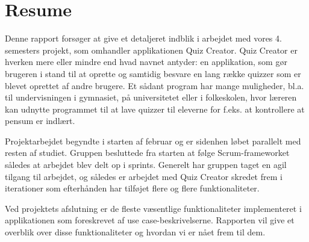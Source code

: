 \chapter*{Resume}
Denne rapport forsøger at give et detaljeret indblik i arbejdet med vores 4. semesters projekt, som omhandler applikationen Quiz Creator. Quiz Creator er hverken mere eller mindre end hvad navnet antyder: en applikation, som gør brugeren i stand til at oprette og samtidig besvare en lang række quizzer som er blevet oprettet af andre brugere. Et sådant program har mange muligheder, bl.a. til undervisningen i gymnasiet, på universitetet eller i folkeskolen, hvor læreren kan udnytte programmet til at lave quizzer til eleverne for f.eks. at kontrollere at pensum er indlært.

Projektarbejdet begyndte i starten af februar og er sidenhen løbet parallelt med resten af studiet. Gruppen besluttede fra starten at følge Scrum-frameworket således at arbejdet blev delt op i sprints. Generelt har gruppen taget en agil tilgang til arbejdet, og således er arbejdet med Quiz Creator skredet frem i iterationer som efterhånden har tilføjet flere og flere funktionaliteter. 

Ved projektets afslutning er de fleste væsentlige funktionaliteter implementeret i applikationen som foreskrevet af use case-beskrivelserne. Rapporten vil give et overblik over disse funktionaliteter og hvordan vi er nået frem til dem.
